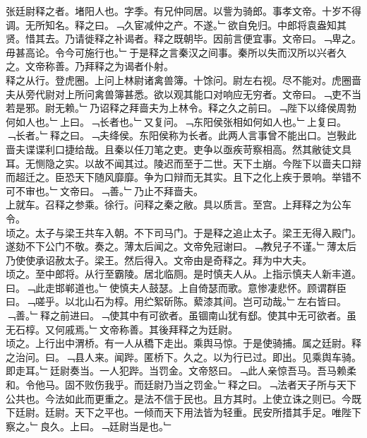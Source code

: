 \documentclass{zhvt-classic}
\begin{document}

\hspace*{2em}张廷尉释之者。堵阳人也。字季。有兄仲同居。以訾为骑郎。事孝文帝。十岁不得调。无所知名。释之曰。﹁久宦减仲之产。不遂。﹂欲自免归。中郎将袁盎知其贤。惜其去。乃请徙释之补谒者。释之既朝毕。因前言便宜事。文帝曰。﹁卑之。毋甚高论。令今可施行也。﹂于是释之言秦汉之间事。秦所以失而汉所以兴者久之。文帝称善。乃拜释之为谒者仆射。\\
\hspace*{2em}释之从行。登虎圈。上问上林尉诸禽兽簿。十馀问。尉左右视。尽不能对。虎圈啬夫从旁代尉对上所问禽兽簿甚悉。欲以观其能口对响应无穷者。文帝曰。﹁吏不当若是邪。尉无赖。﹂乃诏释之拜啬夫为上林令。释之久之前曰。﹁陛下以绛侯周勃何如人也。﹂上曰。﹁长者也。﹂又复问。﹁东阳侯张相如何如人也。﹂上复曰。﹁长者。﹂释之曰。﹁夫绛侯。东阳侯称为长者。此两人言事曾不能出口。岂斅此啬夫谍谍利口捷给哉。且秦以任刀笔之吏。吏争以亟疾苛察相高。然其敝徒文具耳。无恻隐之实。以故不闻其过。陵迟而至于二世。天下土崩。今陛下以啬夫口辩而超迁之。臣恐天下随风靡靡。争为口辩而无其实。且下之化上疾于景响。举错不可不审也。﹂文帝曰。﹁善。﹂乃止不拜啬夫。\\
\hspace*{2em}上就车。召释之参乘。徐行。问释之秦之敝。具以质言。至宫。上拜释之为公车令。\\
\hspace*{2em}顷之。太子与梁王共车入朝。不下司马门。于是释之追止太子。梁王无得入殿门。遂劾不下公门不敬。奏之。薄太后闻之。文帝免冠谢曰。﹁教兒子不谨。﹂薄太后乃使使承诏赦太子。梁王。然后得入。文帝由是奇释之。拜为中大夫。\\
\hspace*{2em}顷之。至中郎将。从行至霸陵。居北临厕。是时慎夫人从。上指示慎夫人新丰道。曰。﹁此走邯郸道也。﹂使慎夫人鼓瑟。上自倚瑟而歌。意惨凄悲怀。顾谓群臣曰。﹁嗟乎。以北山石为椁。用纻絮斫陈。蕠漆其间。岂可动哉。﹂左右皆曰。﹁善。﹂释之前进曰。﹁使其中有可欲者。虽锢南山犹有郄。使其中无可欲者。虽无石椁。又何戚焉。﹂文帝称善。其後拜释之为廷尉。\\
\hspace*{2em}顷之。上行出中渭桥。有一人从穚下走出。乘舆马惊。于是使骑捕。属之廷尉。释之治问。曰。﹁县人来。闻跸。匿桥下。久之。以为行已过。即出。见乘舆车骑。即走耳。﹂廷尉奏当。一人犯跸。当罚金。文帝怒曰。﹁此人亲惊吾马。吾马赖柔和。令他马。固不败伤我乎。而廷尉乃当之罚金。﹂释之曰。﹁法者天子所与天下公共也。今法如此而更重之。是法不信于民也。且方其时。上使立诛之则已。今既下廷尉。廷尉。天下之平也。一倾而天下用法皆为轻重。民安所措其手足。唯陛下察之。﹂良久。上曰。﹁廷尉当是也。﹂\\
\end{document}
